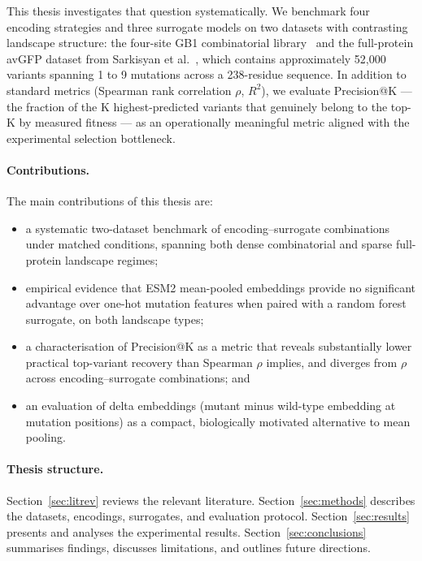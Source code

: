 \documentclass[english, 12pt, a4paper, elec, utf8, a-2b, online]{aaltothesis}
\begin{document}
This thesis investigates that question systematically.
We benchmark four encoding strategies and three surrogate models on two datasets with contrasting
landscape structure: the four-site GB1 combinatorial library~\cite{Wu2019} and the full-protein
avGFP dataset from Sarkisyan et al.~\cite{Sarkisyan2016}, which contains approximately 52,000
variants spanning 1 to 9 mutations across a 238-residue sequence.
In addition to standard metrics (Spearman rank correlation $\rho$, $R^2$), we evaluate
Precision@K --- the fraction of the K highest-predicted variants that genuinely belong to the
top-K by measured fitness --- as an operationally meaningful metric aligned with
the experimental selection bottleneck.

\paragraph{Contributions.}
The main contributions of this thesis are:
\begin{itemize}
  \item a systematic two-dataset benchmark of encoding--surrogate combinations under matched conditions, spanning both dense combinatorial and sparse full-protein landscape regimes;
  \item empirical evidence that ESM2 mean-pooled embeddings provide no significant advantage over one-hot mutation features when paired with a random forest surrogate, on both landscape types;
  \item a characterisation of Precision@K as a metric that reveals substantially lower practical top-variant recovery than Spearman $\rho$ implies, and diverges from $\rho$ across encoding--surrogate combinations; and
  \item an evaluation of delta embeddings (mutant minus wild-type embedding at mutation positions) as a compact, biologically motivated alternative to mean pooling.
\end{itemize}

\paragraph{Thesis structure.}
Section~\ref{sec:litrev} reviews the relevant literature.
Section~\ref{sec:methods} describes the datasets, encodings, surrogates, and evaluation protocol.
Section~\ref{sec:results} presents and analyses the experimental results.
Section~\ref{sec:conclusions} summarises findings, discusses limitations, and outlines
future directions.
\end{document}
